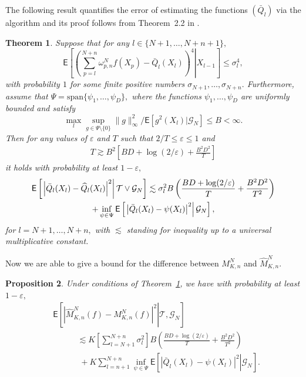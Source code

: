 \documentclass[preprint]{imsart}
\def\NtrainPath{T}
\def\TrainSet{\mathcal{T}}
\newtheorem{thm}{Theorem}
\newtheorem{prop}[thm]{Proposition}
\begin{document}
The following result quantifies the error of estimating the functions \((\bar Q_l)\)
via the algorithm and its proof follows from Theorem~2.2 in \cite{audibert2011robust}.
\begin{thm}\label{berm:theorem:regression_cv}
 Suppose that for any \(l\in \{N+1,\ldots,N+n+1\},\)
\[
\mathsf{E}\left[\left.\left(\sum_{p=l}^{N+n}\omega_{p,n}^{N}f(X_{p})-\bar Q_l(X_l)\right)^4\right | X_{l-1}\right]\leq \sigma_l^4,
\]
with probability \(1\) for some finite positive numbers \(\sigma_{N+1},\ldots, \sigma_{N+n}. \)
Furthermore, assume that \(\Psi=\mathrm{span}\{\psi_1,\ldots,\psi_D\},\) where the functions  \(\psi_1,\ldots,\psi_D\) are uniformly bounded and satisfy
\[
\max_{l}\sup_{g\in \Psi\setminus \{0\}} \|g\|^2_\infty/\mathsf{E}[g^2(X_l) | \mathcal{G}_N]\leq B<\infty.
\]
Then for any values of \(\varepsilon\) and \(\NtrainPath\) such that \(2/\NtrainPath\leq \varepsilon\leq 1\) and
\begin{eqnarray*}
\NtrainPath\gtrsim B^2\left[BD+\log(2/\varepsilon)+\frac{B^2D^2}{\NtrainPath}\right]
\end{eqnarray*}
it holds with probability at least \(1-\varepsilon,\)
\begin{multline}
\mathsf{E}\left[ \left.\Bigl|\bar Q_l(X_l)
-\widehat Q_l(X_l)\Bigr|^2\right | \TrainSet \vee \mathcal{G}_N\right]
\lesssim  \sigma^2_l B
\left(\frac{BD+\log(2/\varepsilon)}{\NtrainPath}+\frac{B^2D^2}{\NtrainPath^2}\right)
\\
 +
\inf_{\psi\in \Psi}
\mathsf{E}\left[\left.\left|\bar Q_l(X_{l})-\psi(X_{l})\right|^{2}\right | \mathcal{G}_N \right], \label{eq:regr_error}
\end{multline}
for \(l=N+1,\ldots,N+n,
\) with \(\lesssim\) standing for inequality up to a universal multiplicative constant.
\end{thm}
Now we are able to give  a bound for the difference between \( M_{K,n}^N\) and \(\widehat M_{K,n}^N.\)
\begin{prop}
\label{cor:dif_m}
Under  conditions of Theorem~\ref{berm:theorem:regression_cv}, we have with probability at least \(1-\varepsilon,\)
\begin{align}
\label{eq:main_bound}
&\mathsf{E}\left[\left.\left|\widehat{M}_{K,n}^{N}(f)-M_{K,n}^{N}(f)\right|^{2}\right | \TrainSet,\mathcal{G}_N\right] \\
\nonumber 
&\phantom{\mathsf{E}\widehat{M}_{K,n}^{N}}  \lesssim K\left[\sum_{l=N+1}^{N+n} \sigma^2_l \right]
B
\left(\frac{BD+\log(2/\varepsilon)}{\NtrainPath}+\frac{B^2D^2}{\NtrainPath^2}\right)
\\ \nonumber
& \phantom{\mathsf{E}|\widehat{M}_{K,n}^{N}} + K \sum_{l=n+1}^{N+n}\inf_{\psi\in \Psi}
\mathsf{E}\left[\left.\left|\bar Q_l(X_{l})-\psi(X_{l})\right|^{2}\right | \mathcal{G}_N \right].
\end{align}
\end{prop}
\end{document}
